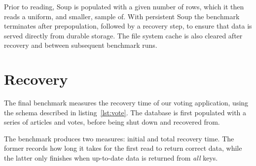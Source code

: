 Prior to reading, Soup is populated with a given number of rows, which it then
reads a uniform, and smaller, sample of. With persistent Soup the benchmark
terminates after prepopulation, followed by a recovery step, to ensure that data
is served directly from durable storage. The file system cache is also cleared
after recovery and between subsequent benchmark runs.

\section{Recovery}\label{sec:bench-recovery}

The final benchmark measures the recovery time of our voting application, using
the schema described in listing~\ref{lst:vote}. The database is first populated
with a series of articles and votes, before being shut down and recovered from.

The benchmark produces two measures: initial and total recovery time. The former
records how long it takes for the first read to return correct data, while the
latter only finishes when up-to-date data is returned from \textit{all} keys.
